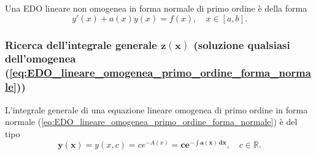 \begin{definition}
    Una EDO lineare non omogenea in forma normale di primo ordine è della forma
    \begin{equation}\label{eq:EDO_lineare_non_omogenea_primo_ordine_forma_normale}
        y'(x)+a(x)y(x)=f(x),\quad x\in[a, b].
    \end{equation}
\end{definition}

\subsubsection{Ricerca dell'integrale generale \texorpdfstring{$\boldsymbol{z(x)}$}{z(x)} (soluzione qualsiasi dell'omogenea (\ref{eq:EDO_lineare_omogenea_primo_ordine_forma_normale}))}
\begin{definition}
    L'integrale generale di una equazione lineare omogenea di primo ordine in forma normale (\ref{eq:EDO_lineare_omogenea_primo_ordine_forma_normale}) è del tipo
    \begin{equation}\label{eq:integrale_generale_EDO_lineare_omogonea_primo_ordine}
        \boldsymbol{y(x)=}y(x,c)=ce^{-A(x)}=\boldsymbol{ce^{-\int a(x)\, dx}},\quad c\in\mathbb R.
    \end{equation}
\end{definition}

